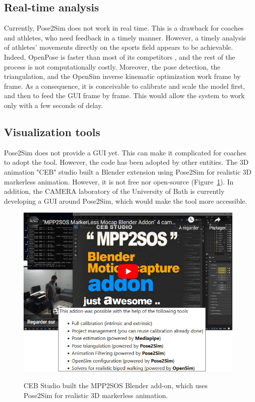 \subsection{Real-time analysis}\label{subsec:realtime}

Currently, Pose2Sim does not work in real time. This is a drawback for coaches and athletes, who need feedback in a timely manner. However, a timely analysis of athletes’ movements directly on the sports field appears to be achievable. Indeed, OpenPose is faster than most of its competitors \cite{Chen2020}, and the rest of the process is not computationally costly. Moreover, the pose detection, the triangulation, and the OpenSim inverse kinematic optimization work frame by frame. As a consequence, it is conceivable to calibrate and scale the model first, and then to feed the GUI frame by frame. This would allow the system to work only with a few seconds of delay.


\clearpage
\subsection{Visualization tools}\label{subsec:viztools}

Pose2Sim does not provide a GUI yet. This can make it complicated for coaches to adopt the tool. However, the code has been adopted by other entities. The 3D animation "CEB" studio built a Blender \cite{Blender1998} extension using Pose2Sim for realistic 3D markerless animation. However, it is not free nor open-source \cite{Barreto2022} (Figure~\ref{fig_mpp2sos}). In addition, the CAMERA laboratory of the University of Bath is currently developing a GUI around Pose2Sim, which would make the tool more accessible. 

\begin{figure}[hbtp]
      \centering
      \def\svgwidth{1\columnwidth}
      \fontsize{10pt}{10pt}\selectfont
      \href{https://blendermarket.com/products/mocap-mpp2soss}{
            \includegraphics[width=1\linewidth]{"../Chap3/Figures/Fig_MPP2SOS.png"}
      }
      \caption{CEB Studio built the MPP2SOS Blender add-on, which uses Pose2Sim for realistic 3D markerless animation.}
      \label{fig_mpp2sos}
\end{figure}

